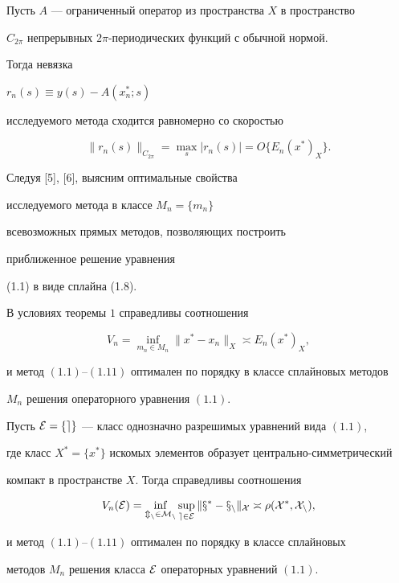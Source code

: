 \begin{cornonum}


Пусть $A$ --- ограниченный оператор из пространства $X$ в пространство


$C_{2\pi}$ непрерывных $2\pi$-периодических функций с обычной нормой.


Тогда невязка


$r_n (s) \equiv y(s)-A(x^{*}_{n};s)$


исследуемого метода сходится равномерно со скоростью


\begin{equation}


\|r_{n}(s)\|_{C_{2\pi}}=\max_{s}|r_n (s)|=O\{E_n (x^*)_X \}.


\end{equation}


\end{cornonum}





Следуя [5], [6], выясним оптимальные свойства 


исследуемого метода в классе $M_n=\{m_n\}$


всевозможных прямых методов, позволяющих построить 


приближенное решение уравнения


(1.1) в виде сплайна (1.8).





\begin{thm}


В условиях теоремы $1$ справедливы соотношения


$$


V_n=\inf_{m_n \in M_n} \| x^* -x_n \|_X \asymp E_n (x^*)_X,


$$


и метод $(1.1)$--$(1.11)$ оптимален по порядку в классе сплайновых методов


$M_n$ решения операторного уравнения $(1.1)$.


\end{thm}





\begin{thm}


Пусть $\cal E=\{e\}$ --- класс однозначно разрешимых уравнений вида $(1.1)$,


где класс $X^*=\{x^*\}$ искомых элементов образует центрально-симметрический


компакт в пространстве $X$. Тогда справедливы соотношения


$$


V_n (\rE)=\inf_{m_n \in M_n} \sup_{e \in \rE}


\|x^* - x_n\|_X \asymp \rho ( X^*,X_n ),


$$


и метод $(1.1)$--$(1.11)$ оптимален по порядку в классе сплайновых 


методов $M_n$ решения класса $\cal E$ операторных уравнений $(1.1)$.


\end{thm}





